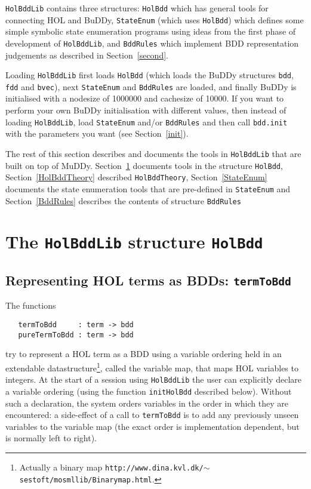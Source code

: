 \documentclass[12pt]{article}
\newcommand{\bnind}[1]{\index[MLbn]{#1}}
\renewcommand{\t}[1]{\mbox{\tt #1}}
\newcommand{\ty}[1]{\mbox{\tt #1}}
\newcommand{\ml}[1]{{\tt #1}}
\newcommand\HOL{HOL\xspace}
\newcommand{\Buddy}{BuDDy\xspace}
\newcommand{\Muddy}{MuDDy\xspace}
\newcommand\fun{\mbox{\tt{->}}}
\begin{document}
\t{HolBddLib} contains three structures: \t{HolBdd} which has general
tools for connecting \HOL{} and \Buddy, \t{StateEnum} (which uses
\t{HolBdd}) which defines some simple symbolic state enumeration
programs using ideas from the first phase of development of \ml{HolBddLib},
and \ml{BddRules} which implement BDD representation judgements as described
in Section~\ref{second}.

Loading \t{HolBddLib} first loads \t{HolBdd} (which loads the \Buddy{}
structures \t{bdd}, \t{fdd} and \t{bvec}), next \t{StateEnum} and \ml{BddRules} are
loaded, and finally \Buddy{} is initialised with a nodesize of 1000000
and cachesize of 10000.  If you want to perform your own \Buddy{}
initialisation with different values, then instead of loading
\t{HolBddLib}, load \t{StateEnum} and/or \ml{BddRules} and then call
\t{bdd.init} with the parameters you want (see Section~\ref{init}).


The rest of this section describes and documents the tools in \t{HolBddLib}
that are built on top of \Muddy.
Section~\ref{HolBdd} documents tools in the structure \ml{HolBdd},
Section~\ref{HolBddTheory} described \ml{HolBddTheory},
Section~\ref{StateEnum} documents the state enumeration
tools that are pre-defined in \t{StateEnum} and Section~\ref{BddRules}
describes the contents of structure \ml{BddRules}

\section{The \ml{HolBddLib} structure \ml{HolBdd}}\label{HolBdd}

\subsection{Representing \HOL{} terms as BDDs: \t{termToBdd}}\label{termToBdd}

The functions


%
%
%

\begin{verbatim}
   termToBdd     : term -> bdd
   pureTermToBdd : term -> bdd
\end{verbatim}\bnind{\ml{termToBdd}}\bnind{\ml{pureTermToBdd}}

try to represent a \HOL{} term as a BDD using a variable ordering held in
an extendable datastructure\footnote{Actually a binary map
{\tt{http://www.dina.kvl.dk/${\sim}$sestoft/mosmllib/Binarymap.html}}.},
called the variable map, that maps \HOL{} variables to integers. At
the start of a session using \t{HolBddLib} the user can explicitly declare
a variable ordering (using the function \t{initHolBdd} described
below). Without such a declaration, the system orders variables in the
order in which they are encountered: a side-effect of a call to
\t{termToBdd} is to add any previously unseen variables to the
variable map (the exact order is implementation dependent, but is
normally left to right).
\end{document}
